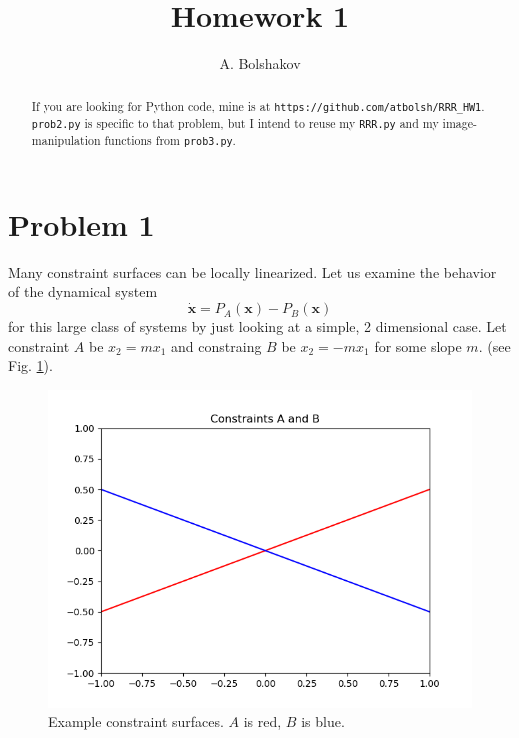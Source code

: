 \documentclass[psamsfonts]{amsart}
\title{Homework 1}
\author{A. Bolshakov}
\theoremstyle{definition}
\theoremstyle{remark}
\numberwithin{equation}{section}
\begin{document}
\maketitle


\begin{abstract}
If you are looking for Python code, mine is at \texttt{https://github.com/atbolsh/RRR\_HW1}.
\texttt{prob2.py} is specific to that problem, but I intend to reuse my 
\texttt{RRR.py} and my image-manipulation functions from \texttt{prob3.py}.
\end{abstract}

\section{Problem 1}

Many constraint surfaces can be locally linearized. 
Let us examine the behavior of the dynamical system
\[
\dot{\mathbf{x}} = P_A(\mathbf{x}) - P_B(\mathbf{x})
\]
for this large class of systems by just looking at a simple, 2 dimensional case. 
Let constraint $A$ be
$x_2 = mx_1$
and constraing $B$ be 
$x_2 = -mx_1$
for some slope $m$.
(see Fig. \ref{fig1}).




\begin{figure}
\includegraphics[scale=0.5]{../images/Figure_1.png}
\caption{Example constraint surfaces. $A$ is red, $B$ is blue.}
\label{fig1}
\end{figure}
\end{document}
